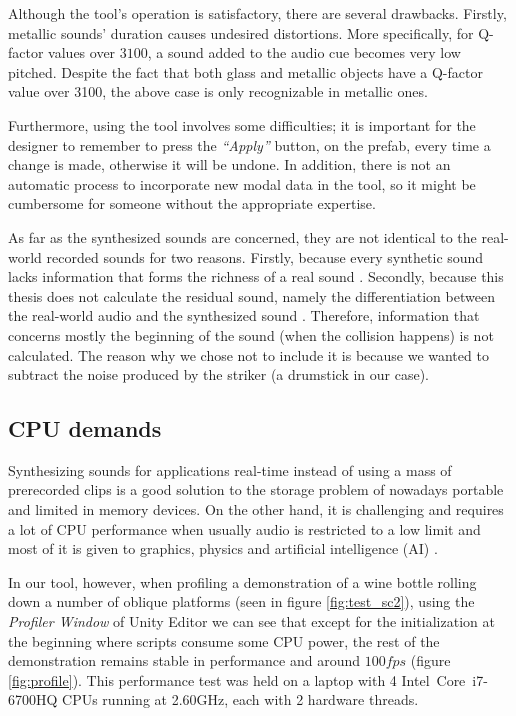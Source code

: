 Although the tool's operation is satisfactory, there are several drawbacks. Firstly, metallic sounds' duration causes undesired distortions. More specifically, for Q-factor values over $3100$, a sound added to the audio cue becomes very low pitched. Despite the fact that both glass and metallic objects have a Q-factor value over 3100, the above case is only recognizable in metallic ones.

Furthermore, using the tool involves some difficulties; it is important for the designer to remember to press the \textit{``Apply''} button, on the prefab, every time a change is made, otherwise it will be undone. In addition, there is not an automatic process to incorporate new modal data in the tool, so it might be cumbersome for someone without the appropriate expertise.

As far as the synthesized sounds are concerned, they are not identical to the real-world recorded sounds for two reasons. Firstly, because every synthetic sound lacks information that forms the richness of a real sound \cite{giordano2006material}. Secondly, because this thesis does not calculate the residual sound, namely the differentiation between the real-world audio and the synthesized sound \cite{ren2013example}. Therefore, information that concerns mostly the beginning of the sound (when the collision happens) is not calculated. The reason why we chose not to include it is because we wanted to subtract the noise produced by the striker (a drumstick in our case).

\subsection{CPU demands}
Synthesizing sounds for applications real-time instead of using a mass of prerecorded clips is a good solution to the storage problem of nowadays portable and limited in memory devices. On the other hand, it is challenging and requires a lot of CPU performance when usually audio is restricted to a low limit and most of it is given to graphics, physics and artificial intelligence (AI) \cite{lloyd2011sound}. 

In our tool, however, when profiling a demonstration of a wine bottle rolling down a number of oblique platforms (seen in figure \ref{fig:test_sc2}), using the \textit{Profiler Window} of Unity\textsuperscript{\textregistered} Editor we can see that except for the initialization at the beginning where scripts consume some CPU power, the rest of the demonstration remains stable in performance and around $100 fps$ (figure \ref{fig:profile}). This performance test was held on a laptop with 4 Intel\textregistered\ Core\texttrademark\ i7-6700HQ CPUs running at 2.60GHz, each with 2 hardware threads.

